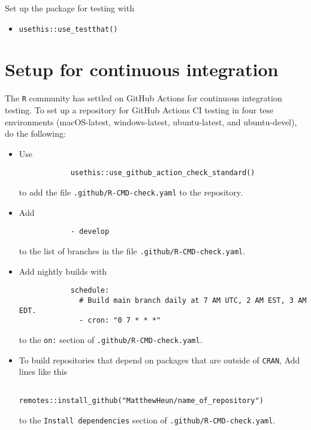 \documentclass{article}
\begin{document}
Set up the package for testing with

\begin{itemize}

  \item \verb|usethis::use_testthat()|

\end{itemize}


\section{Setup for continuous integration}
\label{sec:ci_setup}

The \texttt{R} community has settled on GitHub Actions for continuous integration testing.
To set up a repository for GitHub Actions CI testing in four tese environments
(macOS-latest, windows-latest, ubuntu-latest, and ubuntu-devel), 
do the following:
%
\begin{itemize}

  \item Use 
  		\begin{verbatim}
			usethis::use_github_action_check_standard()
  	 	\end{verbatim}
		to add the file \texttt{.github/R-CMD-check.yaml} 
		to the repository.
        
  \item Add 
  		\begin{verbatim}
			- develop
		\end{verbatim}
		to the list of branches in the file \texttt{.github/R-CMD-check.yaml}.
  
  \item Add nightly builds with 
  		\begin{verbatim}
			schedule:
			  # Build main branch daily at 7 AM UTC, 2 AM EST, 3 AM EDT.
			  - cron: "0 7 * * *"
		\end{verbatim}
	    to the \texttt{on:} section of \texttt{.github/R-CMD-check.yaml}.\
		
  \item To build repositories that depend on packages that are outside of \texttt{CRAN}, 
		Add lines like this
	        \begin{verbatim}
				remotes::install_github("MatthewHeun/name_of_repository")
			\end{verbatim}
		to the \texttt{Install dependencies} section of
		\texttt{.github/R-CMD-check.yaml}.
		
\end{itemize}
\end{document}
